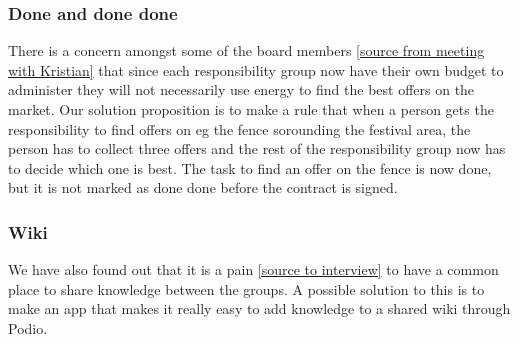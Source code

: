 \subsubsection{Done and done done}
There is a concern amongst some of the board members \ref{source from meeting
with Kristian} that since each responsibility group now have their own budget to
administer they will not necessarily use energy to find the best offers on the
market. Our solution proposition is to make a rule that when a person gets the
responsibility to find offers on eg the fence sorounding the festival area, the
person has to collect three offers and the rest of the responsibility group now
has to decide which one is best. The task to find an offer on the fence is now
done, but it is not marked as done done before the contract is signed.

\subsubsection{Wiki}
We have also found out that it is a pain \ref{source to interview} to have a
common place to share knowledge between the groups. A possible solution to this
is to make an app that makes it really easy to add knowledge to a shared wiki
through Podio.


